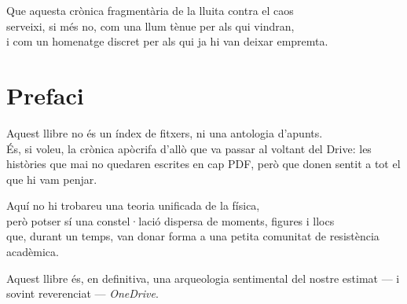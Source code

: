 \medskip

\noindent
Que aquesta crònica fragmentària de la lluita contra el caos\\
serveixi, si més no, com una llum tènue per als qui vindran,\\
i com un homenatge discret per als qui ja hi van deixar empremta.

\cleardoublepage

\chapter*{Prefaci}
\vspace{0.5cm}

\noindent
Aquest llibre no és un índex de fitxers, ni una antologia d’apunts.\\
És, si voleu, la crònica apòcrifa d’allò que va passar al voltant del Drive: les històries que mai no quedaren escrites en cap PDF, però que donen sentit a tot el que hi vam penjar.\\

\medskip

\noindent
Aquí no hi trobareu una teoria unificada de la física,\\
però potser sí una constel·lació dispersa de moments, figures i llocs\\
que, durant un temps, van donar forma a una petita comunitat de resistència acadèmica.\\

\medskip

\noindent
Aquest llibre és, en definitiva, una arqueologia sentimental del nostre estimat — i sovint reverenciat — \textit{OneDrive}.

\cleardoublepage

\tableofcontents